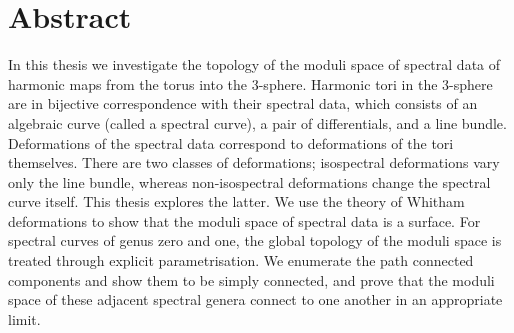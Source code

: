 
\section*{Abstract}
In this thesis we investigate the topology of the moduli space of spectral data of harmonic maps from the torus into the 3-sphere.
Harmonic tori in the 3-sphere are in bijective correspondence with their spectral data, which consists of an algebraic curve (called a spectral curve), a pair of differentials, and a line bundle. Deformations of the spectral data correspond to deformations of the tori themselves. There are two classes of deformations; isospectral deformations vary only the line bundle, whereas non-isospectral deformations change the spectral curve itself.
This thesis explores the latter.
We use the theory of Whitham deformations to show that the moduli space of spectral data is a surface. For spectral curves of genus zero and one, the global topology of the moduli space is treated through explicit parametrisation. We enumerate the path connected components and show them to be simply connected, and prove that the moduli space of these adjacent spectral genera connect to one another in an appropriate limit.
